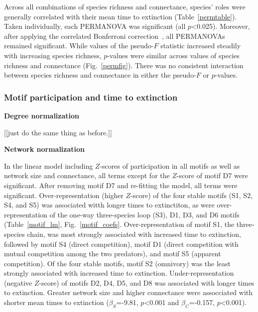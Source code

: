 \documentclass[12pt]{article}
\begin{document}
		Across all combinations of species richness and connectance, species' roles were generally correlated with their mean time to extinction (Table~\ref{permtable}). Taken individually, each PERMANOVA was significant (all $p$\textless0.025). Moreover, after applying the correlated Bonferroni correction~\citep{Drezner2016}, all PERMANOVAs remained significant. While values of the pseudo-$F$ statistic increased steadily with increasing species richness, $p$-values were similar across values of species richness and connectance (Fig.~\ref{permfig}). There was no consistent interaction between species richness and connectance in either the pseudo-$F$ or $p$-values.


		\subsubsection*{Motif participation and time to extinction}

			\textbf{Degree normalization}


				[[just do the same thing as before.]]


			\textbf{Network normalization}

				In the linear model including $Z$-scores of participation in all motifs as well as network size and connectance, all terms except for the $Z$-score of motif D7 were significant.
				After removing motif D7 and re-fitting the model, all terms were significant.
				Over-representation (higher $Z$-score) of the four stable motifs (S1, S2, S4, and S5) was associated witth longer times to extinctiton, as were over-representation of the one-way three-species loop (S3), D1, D3, and D6 motifs (Table~\ref{motif_lm}, Fig.~\ref{motif_coefs}. 
				Over-representation of motif S1, the three-species chain, was most strongly associated with increased time to extinction, followed by motif S4 (direct competition), motif D1 (direct competition with mutual competition among the two predators), and motif S5 (apparent competition).
				Of the four stable motifs, motif S2 (omnivory) was the least strongly associated with increased time to extinction.
				Under-representation (negative $Z$-score) of motifs D2, D4, D5, and D8 was associated with longer times to extinction.
				Greater network size and higher connectance were assocciated with shorter mean times to extinction ($\beta_{S}$=-9.81, $p$\textless0.001 and $\beta_{C}$=-0.157, $p$\textless0.001).
\end{document}
